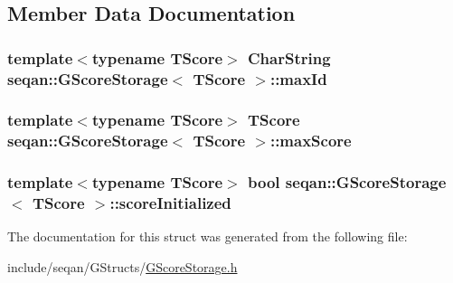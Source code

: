 \subsection{Member Data Documentation}
\hypertarget{structseqan_1_1_g_score_storage_a264d4bc37f5c32b79a8fbbb5ffd24a4f}{
\subsubsection[{max\-Id}]{\setlength{\rightskip}{0pt plus 5cm}template$<$typename T\-Score$>$ Char\-String {\bf seqan\-::\-G\-Score\-Storage}$<$ T\-Score $>$\-::max\-Id}}\label{structseqan_1_1_g_score_storage_a264d4bc37f5c32b79a8fbbb5ffd24a4f}
\hypertarget{structseqan_1_1_g_score_storage_a6473cc22038cb7f21df5866a6c452883}{
\subsubsection[{max\-Score}]{\setlength{\rightskip}{0pt plus 5cm}template$<$typename T\-Score$>$ T\-Score {\bf seqan\-::\-G\-Score\-Storage}$<$ T\-Score $>$\-::max\-Score}}\label{structseqan_1_1_g_score_storage_a6473cc22038cb7f21df5866a6c452883}
\hypertarget{structseqan_1_1_g_score_storage_a57225443721c66d5a3e5290775dd350c}{
\subsubsection[{score\-Initialized}]{\setlength{\rightskip}{0pt plus 5cm}template$<$typename T\-Score$>$ bool {\bf seqan\-::\-G\-Score\-Storage}$<$ T\-Score $>$\-::score\-Initialized}}\label{structseqan_1_1_g_score_storage_a57225443721c66d5a3e5290775dd350c}


The documentation for this struct was generated from the following file\-:\begin{DoxyCompactItemize}
\item 
include/seqan/\-G\-Structs/\hyperlink{_g_score_storage_8h}{G\-Score\-Storage.\-h}\end{DoxyCompactItemize}
